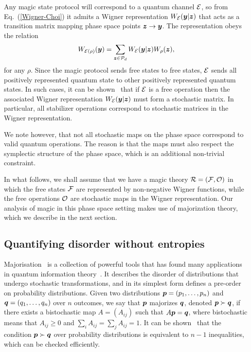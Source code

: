 \documentclass[pra,
aps,
twocolumn,
superscriptaddress,
groupedaddress,
nofootinbib,
reprint
]{revtex4-1}
\begin{document}
Any magic state protocol will correspond to a quantum channel ${\mathcal E}$, so from Eq.~(\ref{Wigner-Choi}) it admits a Wigner representation $W_{{\mathcal E}}(\boldsymbol{y} | \bm{z})$ that acts as a transition matrix mapping phase space points $\bm{z} \rightarrow \boldsymbol{y}$. The representation obeys the relation 
\begin{equation}
	W_{{\mathcal E}(\rho)} (\boldsymbol{y}) = \sum_{\bm{z} \in {\mathcal P}_d} W_{{\mathcal E}}( \boldsymbol{y} | \bm{z}) W_\rho(\bm{z}),
\end{equation}
for any $\rho$. Since the magic protocol sends free states to free states, ${\mathcal E}$ sends all positively represented quantum state to other positively represented quantum states. In such cases, it can be shown~\cite{Wang_2019} that if ${\mathcal E}$ is a free operation then the associated Wigner representation $W_{{\mathcal E}}(\boldsymbol{y} |\bm{z})$ must form a stochastic matrix. In particular, all stabilizer operations correspond to stochastic matrices in the Wigner representation. 

We note however, that not all stochastic maps on the phase space correspond to valid quantum operations. The reason is that the maps must also respect the symplectic structure of the phase space, which is an additional non-trivial constraint.

In what follows, we shall assume that we have a magic theory ${\mathcal R} = ({\mathcal F}, {\mathcal O})$ in which the free states ${\mathcal F}$ are represented by non-negative Wigner functions, while the free operations ${\mathcal O}$ are stochastic maps in the Wigner representation. Our analysis of magic in this phase space setting makes use of majorization theory, which we describe in the next section.



\subsection{Quantifying disorder without entropies}
\label{sec:major}

Majorisation~\cite{cit:marshall, Blackwell_1953} is a collection of powerful tools that has found many applications in quantum information theory~\cite{Nielsen_1999, cit:cwiklinski, cit:lostaglio2, cit:gour, cit:gour2, Horodecki_2003, Vallejos_2021}.
It describes the disorder of distributions that undergo stochastic transformations, and in its simplest form defines a pre-order on probability distributions. Given two distributions $\boldsymbol{p}= (p_1, \dots, p_n)$ and $\boldsymbol{q} = (q_1, \dots, q_n)$ over $n$ outcomes, we say that $\boldsymbol{p}$ majorizes $\boldsymbol{q}$, denoted $\boldsymbol{p} \succ \boldsymbol{q}$, if there exists a bistochastic map $A = (A_{ij})$ such that $A\boldsymbol{p} = \boldsymbol{q}$, where bistochastic means that $A_{ij} \geq 0$ and $\sum_i A_{ij} = \sum_j A_{ij} = 1$. It can be shown~\cite{cit:marshall} that the condition $ \boldsymbol{p} \succ \boldsymbol{q}$ over probability distributions is equivalent to $n-1$ inequalities, which can be checked efficiently.
\end{document}
